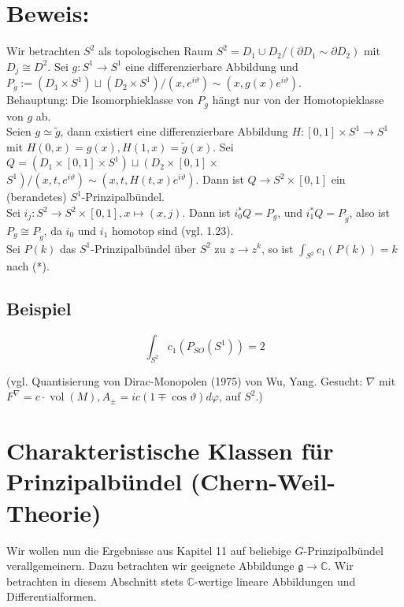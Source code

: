 \documentclass[10pt, letterpaper]{article}
\begin{document}
\section*{Beweis:}
Wir betrachten $S^{2}$ als topologischen Raum $S^{2}=D_{1} \cup D_{2} /\left(\partial D_{1} \sim \partial D_{2}\right)$ mit $D_{j} \cong D^{2}$. Sei $g: S^{1} \rightarrow S^{1}$ eine differenzierbare Abbildung und $P_{g}:= \left(D_{1} \times S^{1}\right) \sqcup\left(D_{2} \times S^{1}\right) /\left(x, e^{i \vartheta}\right) \sim\left(x, g(x) e^{i \vartheta}\right)$.\\
Behauptung: Die Isomorphieklasse von $P_{g}$ hängt nur von der Homotopieklasse von $g$ ab.\\
Seien $g \simeq \tilde{g}$, dann existiert eine differenzierbare Abbildung $H:[0,1] \times S^{1} \rightarrow S^{1}$ mit $H(0, x)=g(x), H(1, x)=\tilde{g}(x)$. Sei $Q=\left(D_{1} \times[0,1] \times S^{1}\right) \sqcup\left(D_{2} \times[0,1] \times\right.$\\
$\left.S^{1}\right) /\left(x, t, e^{i \vartheta}\right) \sim\left(x, t, H(t, x) e^{i \vartheta}\right)$. Dann ist $Q \rightarrow S^{2} \times[0,1]$ ein (berandetes) $S^{1}$-Prinzipalbündel.\\
Sei $i_{j}: S^{2} \rightarrow S^{2} \times[0,1], x \mapsto(x, j)$. Dann ist $i_{0}^{*} Q=P_{g}$, und $i_{1}^{*} Q=P_{\tilde{g}}$, also ist $P_{g} \cong P_{\tilde{g}}$, da $i_{0}$ und $i_{1}$ homotop sind (vgl. 1.23).\\
Sei $P(k)$ das $S^{1}$-Prinzipalbündel über $S^{2}$ zu $z \rightarrow z^{k}$, so ist $\int_{S^{2}} c_{1}(P(k))=k$ nach (*).

\subsection*{Beispiel}
$$
\int_{S^{2}} c_{1}\left(P_{S O}\left(S^{1}\right)\right)=2
$$

(vgl. Quantisierung von Dirac-Monopolen (1975) von Wu, Yang. Gesucht: $\nabla$ mit $F^{\nabla}=c \cdot \operatorname{vol}(M), A_{ \pm}=i c(1 \mp \cos \vartheta) d \varphi$, auf $S^{2}$.)

\section*{Charakteristische Klassen für Prinzipalbündel (Chern-Weil-Theorie)}
Wir wollen nun die Ergebnisse aus Kapitel 11 auf beliebige $G$-Prinzipalbündel verallgemeinern. Dazu betrachten wir geeignete Abbildunge $\mathfrak{g} \rightarrow \mathbb{C}$. Wir betrachten in diesem Abschnitt stets $\mathbb{C}$-wertige lineare Abbildungen und Differentialformen.
\end{document}
